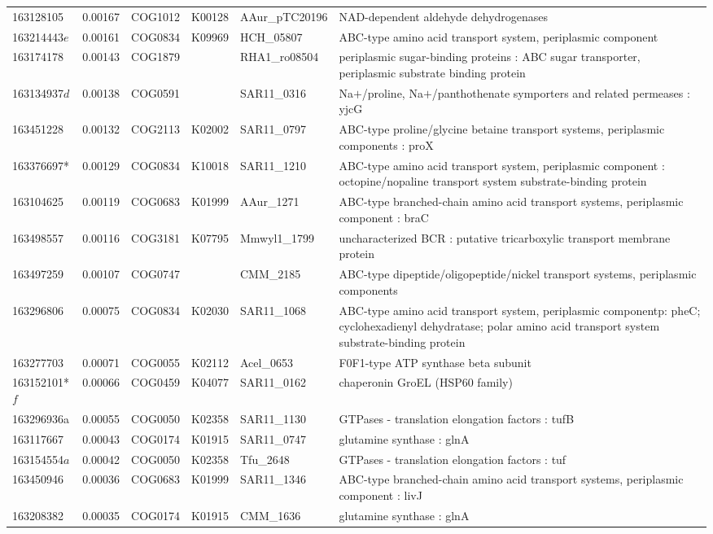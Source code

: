 \begin{landscape}
\begin{longtable}{p{1.6cm}p{1.2cm}p{1.5cm}p{1.5cm}p{2.8cm}p{13.5cm}}
163128105&0.00167&COG1012&K00128&AAur\_pTC20196&NAD-dependent aldehyde dehydrogenases \\
163214443$e$&0.00161&COG0834&K09969&HCH\_05807&ABC-type amino acid transport system, periplasmic component \\
163174178&0.00143&COG1879&&RHA1\_ro08504&periplasmic sugar-binding proteins : ABC sugar transporter, periplasmic substrate binding protein \\
163134937$d$&0.00138&COG0591&&SAR11\_0316&Na$+$/proline, Na$+$/panthothenate symporters and related permeases : yjcG \\
163451228&0.00132&COG2113&K02002&SAR11\_0797&ABC-type proline/glycine betaine transport systems, periplasmic components : proX \\
163376697*&0.00129&COG0834&K10018&SAR11\_1210&ABC-type amino acid transport system, periplasmic component : octopine/nopaline transport system  substrate-binding protein \\
163104625&0.00119&COG0683&K01999&AAur\_1271&ABC-type branched-chain amino acid transport systems, periplasmic component : braC \\
163498557&0.00116&COG3181&K07795&Mmwyl1\_1799&uncharacterized BCR : putative tricarboxylic transport membrane protein \\
163497259&0.00107&COG0747&&CMM\_2185&ABC-type dipeptide/oligopeptide/nickel transport systems, periplasmic components \\
163296806&0.00075&COG0834&K02030&SAR11\_1068&ABC-type amino acid transport system, periplasmic componentp: pheC; cyclohexadienyl dehydratase; polar amino acid transport system substrate-binding protein \\
163277703&0.00071&COG0055&K02112&Acel\_0653&F0F1-type ATP synthase beta subunit \\
163152101*$f$&0.00066&COG0459&K04077&SAR11\_0162&chaperonin GroEL (HSP60 family) \\
163296936a&0.00055&COG0050&K02358&SAR11\_1130&GTPases - translation elongation factors : tufB \\
163117667&0.00043&COG0174&K01915&SAR11\_0747&glutamine synthase : glnA \\
163154554$a$&0.00042&COG0050&K02358&Tfu\_2648&GTPases - translation elongation factors : tuf \\
163450946&0.00036&COG0683&K01999&SAR11\_1346&ABC-type branched-chain amino acid transport systems, periplasmic component : livJ \\
163208382&0.00035&COG0174&K01915&CMM\_1636&glutamine synthase : glnA \\

\end{longtable}
\end{landscape}
